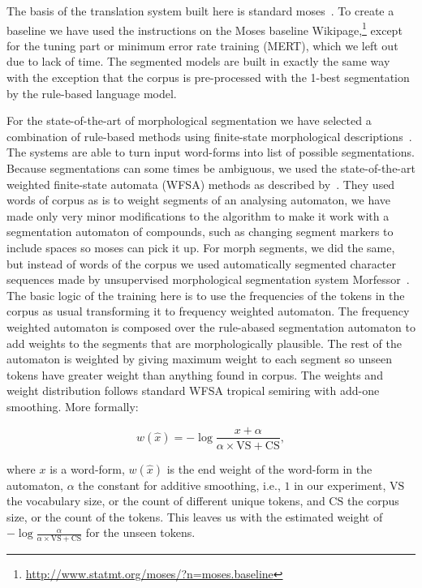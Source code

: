 \documentclass[color]{pbml}
\begin{document}
The basis of the translation system built here is standard moses~\citep{koehn}.
To create a baseline we have used the instructions on the Moses baseline
Wikipage,\footnote{\url{http://www.statmt.org/moses/?n=moses.baseline}} except
for the tuning part or minimum error rate training (MERT), which we left out
due to lack of time. The segmented models are built in exactly the same way
with the exception that the corpus is pre-processed with the 1-best
segmentation by the rule-based language model.

For the state-of-the-art of morphological segmentation we have selected a
combination of rule-based methods using finite-state morphological
descriptions~\citep{beesley2003finite,pirinen2010}. The systems are able to
turn input word-forms into list of possible segmentations.  Because
segmentations can some times be ambiguous, we used the state-of-the-art
weighted finite-state automata (WFSA) methods as described
by~\citet{pirinen2010weighting}. They used words of corpus as is to weight
segments of an analysing automaton, we have made only very minor modifications
to the algorithm to make it work with a segmentation automaton of compounds,
such as changing segment markers to include spaces so moses can pick it up. For
morph segments, we did the same, but instead of words of the corpus we used
automatically segmented character sequences made by unsupervised morphological
segmentation system Morfessor~\cite{virpioja2014morfessor}. The basic logic of
the training here is to use the frequencies of the tokens in the corpus as
usual transforming it to frequency weighted automaton. The frequency weighted
automaton is composed over the rule-abased segmentation automaton to add
weights to the segments that are morphologically plausible. The rest of the
automaton is weighted by giving maximum weight to each segment so unseen tokens
have greater weight than anything found in corpus. The weights and weight
distribution follows standard WFSA tropical semiring with add-one smoothing.
More formally:

\begin{equation}
    w(\hat x) = -\log \frac{x + \alpha}{\alpha \times \mathrm{VS} + \mathrm{CS}},
\end{equation}

\noindent where $x$ is a word-form, $w(\hat x)$ is the end weight of the word-form in the
automaton, $\alpha$ the constant for additive smoothing, i.e., $1$ in our
experiment, $\mathrm{VS}$ the vocabulary size, or the count of different unique
tokens, and $\mathrm{CS}$ the corpus size, or the count of the tokens. This
leaves us with the estimated weight of $-\log\frac{\alpha}{\alpha \times \mathrm{VS} + \mathrm{CS}}$ for the unseen tokens. 
\end{document}
